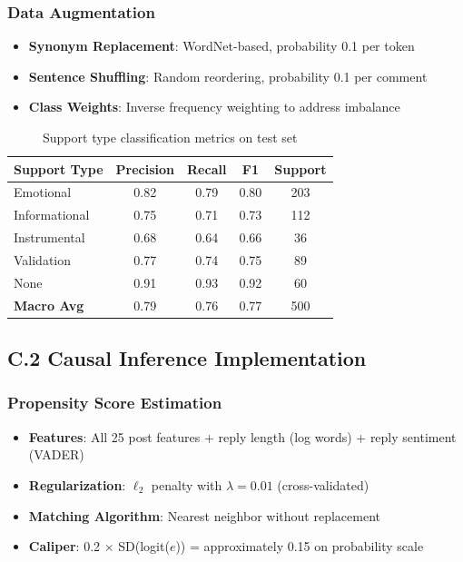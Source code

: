 \documentclass[letterpaper]{article} %
\begin{document}
\subsubsection{Data Augmentation}
\begin{itemize}
\item \textbf{Synonym Replacement}: WordNet-based, probability 0.1 per token
\item \textbf{Sentence Shuffling}: Random reordering, probability 0.1 per comment
\item \textbf{Class Weights}: Inverse frequency weighting to address imbalance
\end{itemize}

\begin{table}[h]
\centering
\caption{Support type classification metrics on test set}
\begin{tabular}{lcccc}
\toprule
\textbf{Support Type} & \textbf{Precision} & \textbf{Recall} & \textbf{F1} & \textbf{Support} \\
\midrule
Emotional & 0.82 & 0.79 & 0.80 & 203 \\
Informational & 0.75 & 0.71 & 0.73 & 112 \\
Instrumental & 0.68 & 0.64 & 0.66 & 36 \\
Validation & 0.77 & 0.74 & 0.75 & 89 \\
None & 0.91 & 0.93 & 0.92 & 60 \\
\midrule
\textbf{Macro Avg} & 0.79 & 0.76 & 0.77 & 500 \\
\bottomrule
\end{tabular}
\end{table}

\subsection{C.2 Causal Inference Implementation}

\subsubsection{Propensity Score Estimation}
\begin{itemize}
\item \textbf{Features}: All 25 post features + reply length (log words) + reply sentiment (VADER)
\item \textbf{Regularization}: $\ell_2$ penalty with $\lambda = 0.01$ (cross-validated)
\item \textbf{Matching Algorithm}: Nearest neighbor without replacement
\item \textbf{Caliper}: 0.2 × SD(logit($e$)) = approximately 0.15 on probability scale
\end{itemize}
\end{document}
